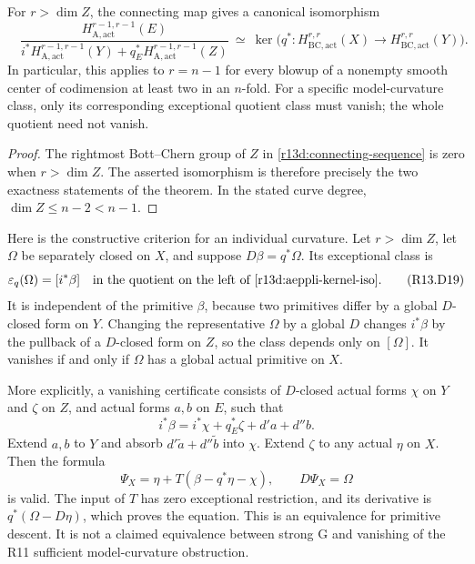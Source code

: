 \begin{corollary}
\label{r13d:aeppli-kernel}
For $r>\dim Z$, the connecting map gives a canonical isomorphism
\[
 \boxed{\quad
 \frac{H_{\mathrm A,\mathrm{act}}^{r-1,r-1}(E)}
 {i^*H_{\mathrm A,\mathrm{act}}^{r-1,r-1}(Y)
        +q_E^*H_{\mathrm A,\mathrm{act}}^{r-1,r-1}(Z)}
 \ \simeq\ 
 \ker\bigl(q^*:H_{\mathrm{BC,act}}^{r,r}(X)
                         \to H_{\mathrm{BC,act}}^{r,r}(Y)\bigr).
 \quad}
\tag{R13.D18}\label{r13d:aeppli-kernel-iso}
\]
In particular, this applies to $r=n-1$ for every blowup of a
nonempty smooth center of codimension at least two in an $n$-fold.
For a specific model-curvature class, only its corresponding
exceptional quotient class must vanish; the whole quotient need
not vanish.
\end{corollary}

\begin{proof}
The rightmost Bott--Chern group of $Z$ in
\eqref{r13d:connecting-sequence} is zero when $r>\dim Z$.
The asserted isomorphism is therefore precisely the two exactness
statements of the theorem.  In the stated curve degree,
$\dim Z\leq n-2<n-1$.
\end{proof}

Here is the constructive criterion for an individual curvature.
Let $r>\dim Z$, let $\Omega$ be separately closed on $X$, and
suppose $D\beta=q^*\Omega$.  Its exceptional class is
\[
 \varepsilon_q(\Omega)
     =[i^*\beta]\quad\text{in the quotient on the left of
                          \eqref{r13d:aeppli-kernel-iso}}.
\tag{R13.D19}\label{r13d:individual-obstruction}
\]
It is independent of the primitive $\beta$, because two primitives
differ by a global $D$-closed form on $Y$.  Changing the representative
$\Omega$ by a global $D$ changes $i^*\beta$ by the pullback of a
$D$-closed form on $Z$, so the class depends only on $[\Omega]$.
It vanishes if and only if $\Omega$ has a global actual primitive
on $X$.

More explicitly, a vanishing certificate consists of $D$-closed
actual forms $\chi$ on $Y$ and $\zeta$ on $Z$, and actual forms
$a,b$ on $E$, such that
\[
                    i^*\beta=i^*\chi+q_E^*\zeta+d'a+d''b.
\]
Extend $a,b$ to $Y$ and absorb $d'\widetilde a+d''\widetilde b$
into $\chi$.  Extend $\zeta$ to any actual $\eta$ on $X$.
Then the formula
\[
                  \boxed{\quad
                  \Psi_X=\eta+T(\beta-q^*\eta-\chi),
                  \qquad D\Psi_X=\Omega\quad}
\tag{R13.D20}\label{r13d:certificate-primitive}
\]
is valid.  The input of $T$ has zero exceptional restriction, and
its derivative is $q^*(\Omega-D\eta)$, which proves the equation.
This is an equivalence for primitive descent.  It is not a claimed
equivalence between strong G and vanishing of the R11 sufficient
model-curvature obstruction.

